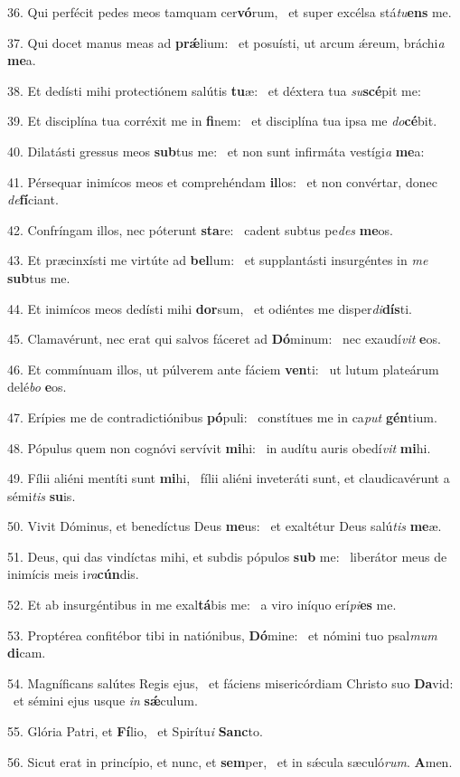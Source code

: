 36. Qui perfécit pedes meos tamquam cer\textbf{vó}rum, \ast\  et super excélsa stá\textit{tu}\textbf{ens} me.\

37. Qui docet manus meas ad \textbf{prǽ}lium: \ast\  et posuísti, ut arcum ǽreum, bráchi\textit{a} \textbf{me}a.\

38. Et dedísti mihi protectiónem salútis \textbf{tu}æ: \ast\  et déxtera tua \textit{su}\textbf{scé}pit me:\

39. Et disciplína tua corréxit me in \textbf{fi}nem: \ast\  et disciplína tua ipsa me \textit{do}\textbf{cé}bit.\

40. Dilatásti gressus meos \textbf{sub}tus me: \ast\  et non sunt infirmáta vestígi\textit{a} \textbf{me}a:\

41. Pérsequar inimícos meos et comprehéndam \textbf{il}los: \ast\  et non convértar, donec \textit{de}\textbf{fí}ciant.\

42. Confríngam illos, nec póterunt \textbf{sta}re: \ast\  cadent subtus pe\textit{des} \textbf{me}os.\

43. Et præcinxísti me virtúte ad \textbf{bel}lum: \ast\  et supplantásti insurgéntes in \textit{me} \textbf{sub}tus me.\

44. Et inimícos meos dedísti mihi \textbf{dor}sum, \ast\  et odiéntes me disper\textit{di}\textbf{dís}ti.\

45. Clamavérunt, nec erat qui salvos fáceret ad \textbf{Dó}minum: \ast\  nec exaudí\textit{vit} \textbf{e}os.\

46. Et commínuam illos, ut púlverem ante fáciem \textbf{ven}ti: \ast\  ut lutum plateárum delé\textit{bo} \textbf{e}os.\

47. Erípies me de contradictiónibus \textbf{pó}puli: \ast\  constítues me in ca\textit{put} \textbf{gén}tium.\

48. Pópulus quem non cognóvi servívit \textbf{mi}hi: \ast\  in audítu auris obedí\textit{vit} \textbf{mi}hi.\

49. Fílii aliéni mentíti sunt \textbf{mi}hi, \ast\  fílii aliéni inveteráti sunt, et claudicavérunt a sémi\textit{tis} \textbf{su}is.\

50. Vivit Dóminus, et benedíctus Deus \textbf{me}us: \ast\  et exaltétur Deus salú\textit{tis} \textbf{me}æ.\

51. Deus, qui das vindíctas mihi, et subdis pópulos \textbf{sub} me: \ast\  liberátor meus de inimícis meis i\textit{ra}\textbf{cún}dis.\

52. Et ab insurgéntibus in me exal\textbf{tá}bis me: \ast\  a viro iníquo erí\textit{pi}\textbf{es} me.\

53. Proptérea confitébor tibi in natiónibus, \textbf{Dó}mine: \ast\  et nómini tuo psal\textit{mum} \textbf{di}cam.\

54. Magníficans salútes Regis ejus, \dag\  et fáciens misericórdiam Christo suo \textbf{Da}vid: \ast\  et sémini ejus usque \textit{in} \textbf{sǽ}culum.\

55. Glória Patri, et \textbf{Fí}lio, \ast\  et Spirítu\textit{i} \textbf{Sanc}to.\

56. Sicut erat in princípio, et nunc, et \textbf{sem}per, \ast\  et in sǽcula sæculó\textit{rum}. \textbf{A}men.\

